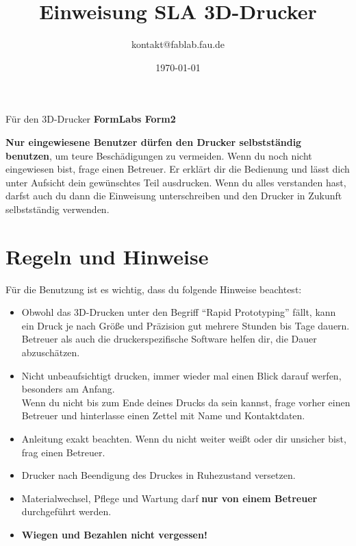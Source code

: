\documentclass{\basedir/fablab-document}
\date{\today}
\author{kontakt@fablab.fau.de}
\title{Einweisung SLA 3D-Drucker}
\begin{document}
	
	\maketitle
	\begin{center}
		Für den 3D-Drucker \textbf{FormLabs Form2}
	\end{center}
	
	\textbf{Nur eingewiesene Benutzer dürfen den Drucker selbstständig benutzen}, um teure Beschädigungen zu vermeiden. Wenn du noch nicht eingewiesen bist, frage einen Betreuer. Er erklärt dir die Bedienung und lässt dich unter Aufsicht dein gewünschtes Teil ausdrucken. Wenn du alles verstanden hast, darfst auch du dann die Einweisung unterschreiben und den Drucker in Zukunft selbstständig verwenden.
	
	\section{Regeln und Hinweise}
	Für die Benutzung ist es wichtig, dass du folgende Hinweise beachtest:
	
	\begin{itemize}
		\item Obwohl das 3D-Drucken unter den Begriff ``Rapid Prototyping'' fällt, kann ein Druck je nach Größe und
		Präzision gut mehrere Stunden bis Tage dauern. Betreuer als auch die druckerspezifische Software helfen dir, die Dauer abzuschätzen.
		\item Nicht unbeaufsichtigt drucken, immer wieder mal einen Blick darauf werfen, besonders am Anfang.\\
		Wenn du nicht bis zum Ende deines Drucks da sein kannst, frage vorher einen Betreuer und hinterlasse einen Zettel mit Name und Kontaktdaten.
		\item Anleitung exakt beachten. Wenn du nicht weiter weißt oder dir unsicher bist, frag einen Betreuer.
		\item Drucker nach Beendigung des Druckes in Ruhezustand versetzen.
		\item Materialwechsel, Pflege und Wartung darf \textbf{nur von einem Betreuer} durchgeführt werden.
		\item \textbf{Wiegen und Bezahlen nicht vergessen!}
	\end{itemize}
\newpage
\end{document}
